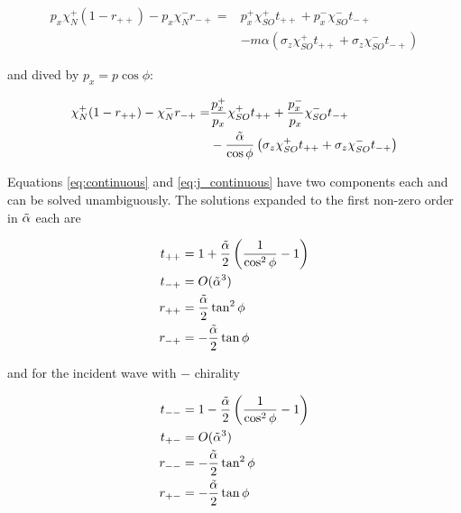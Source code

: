 \begin{align}
    p_x \chi_N^+ (1 - r_{++}) - p_x \chi_N^- r_{-+}
        =& p_x^+ \chi_{SO}^+ t_{++} + p_x^- \chi_{SO}^- t_{-+} \nonumber\\
         &   - m \alpha \left(  \sigma_z \chi_{SO}^+ t_{++}
                            + \sigma_z \chi_{SO}^- t_{-+} \right)
\end{align}

and dived by  $p_x = p \cos \phi$: 

\begin{align}
    \chi_N^+ (1 - r_{++}) - \chi_N^- r_{-+}
        =& \frac{p_x^+}{p_x} \chi_{SO}^+ t_{++} + \frac{p_x^-}{p_x} \chi_{SO}^- t_{-+} \nonumber\\
         &   - \frac{\tilde \alpha}{\cos \phi} \left(\sigma_z \chi_{SO}^+
                 t_{++} + \sigma_z \chi_{SO}^- t_{-+} \right)
                                \label{eq:j_continuous}
\end{align}

Equations \ref{eq:continuous} and \ref{eq:j_continuous} have two
components each and can be solved unambiguously. 
The solutions expanded to the first non-zero order in $\tilde \alpha$ each are

\begin{align}
    t_{++} &= 1 +
            \frac{\tilde \alpha}{2}\left( \frac{1}{\cos^2\phi} - 1 \right)\\
    t_{-+} &= O(\tilde \alpha^3)\\
    r_{++} &= \frac{\tilde \alpha}{2} \tan^2 \phi\\
    r_{-+} &= -\frac{\tilde \alpha}{2} \tan \phi
\end{align}

and for the incident wave with $-$ chirality

\begin{align}
    t_{--} &= 1 - \frac{\tilde \alpha}{2} \left( \frac{1}{\cos^2\phi} - 1 \right)\\
    t_{+-} &= O(\tilde \alpha^3)\\
    r_{--} &= -\frac{\tilde \alpha}{2} \tan^2 \phi\\
    r_{+-} &= -\frac{\tilde \alpha}{2} \tan \phi
\end{align}

